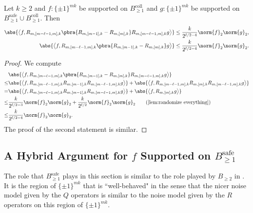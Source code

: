 \begin{corollary}\label{cor:cross terms safe to coll}
    Let $k\geq 2$ and $f:\{\pm1\}^{mk}$ be supported on $B_{\geq 1}^{\mathrm{coll}}$ and $g:\{\pm1\}^{mk}$ be supported on $B_{\geq 1}^{\mathrm{safe}}\cup B_{\geq 1}^{\mathrm{coll}}$. Then 
    \begin{align*}
        \abs{\left\langle f,R_{m,[m-\ell-1,m],k}\pbra{R_{m,[m-1],k}-R_{m,[m],k}}R_{m,[m-\ell-1,m],k}g\right\rangle }\leq \frac{k}{2^{\ell/2-4}}\norm{f}_2\norm{g}_2,\\
        \abs{\left\langle f,R_{m,[m-\ell-1,m],k}\pbra{R_{m,[m-1],k}-R_{m,[m],k}}g\right\rangle }\leq \frac{k}{2^{\ell/2-4}}\norm{f}_2\norm{g}_2.
    \end{align*}
\end{corollary}
\begin{proof}
    We compute
    \begin{align*}
        &\abs{\left\langle f,R_{m,[m-\ell-1,m],k}\pbra{R_{m,[m-1],k}-R_{m,[m],k}}R_{m,[m-\ell-1,m],k}g\right\rangle }\\
        \leq&\abs{\left\langle f,{R_{m,[m-\ell-1,m],k}R_{m,[m-1],k}}R_{m,[m-\ell-1,m],k}g\right\rangle}+\abs{\left\langle f,{R_{m,[m-\ell-1,m],k}R_{m,[m],k}}R_{m,[m-\ell-1,m],k}g\right\rangle }\\
        =&\abs{\left\langle f,{R_{m,[m-\ell-1,m],k}R_{m,[m-1],k}}R_{m,[m-\ell-1,m],k}g\right\rangle}+\abs{\left\langle f,{R_{m,[m],k}}g\right\rangle }\\
        \leq&\frac{k}{2^{\ell/2-3}}\norm{f}_2\norm{g}_2+\frac{k}{2^{\ell/2}}\norm{f}_2\norm{g}_2\tag{\Cref{lem:randomize everything}}\\
        \leq& \frac{k}{2^{\ell/2-4}}\norm{f}_2\norm{g}_2.
    \end{align*}
    The proof of the second statement is similar.
\end{proof}






\subsection{A Hybrid Argument for $f$ Supported on $B_{\geq 1}^{\mathrm{safe}}$}

The role that $B_{\geq 1}^{\mathrm{safe}}$ plays in this section is similar to the role played by $B_{\geq2}$ in . It is the region of $\{\pm1\}^{mk}$ that is ``well-behaved" in the sense that the nicer noise model given by the $Q$ operators is similar to the noise model given by the $R$ operators on this region of $\{\pm1\}^{mk}$. 

